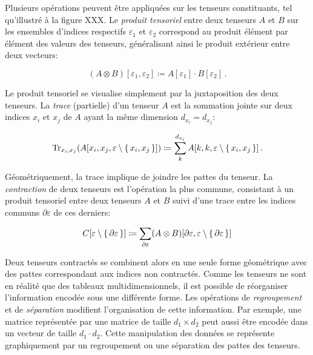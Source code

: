 Plusieurs opérations peuvent être appliquées sur les tenseurs constituants, tel qu'illustré à la figure XXX. Le \textit{produit tensoriel} entre deux tenseurs $A$ et $B$ sur les ensembles d'indices respectifs $\varepsilon_{1}$ et $\varepsilon_{2}$ correspond au produit élément par élément des valeurs des tenseurs, généralisant ainsi le produit extérieur entre deux vecteurs:

\begin{equation}
    (A \otimes B)[\varepsilon_{1}, \varepsilon_{2}] \coloneq A[\varepsilon_{1}] \cdot B[\varepsilon_{2}] \,.
\end{equation}

Le produit tensoriel se visualise simplement par la juxtaposition des deux tenseurs. La \textit{trace} (partielle) d'un tenseur $A$ est la sommation jointe sur deux indices $x_{i}$ et $x_{j}$ de $A$ ayant la même dimension $d_{x_{i}} = d_{x_{j}}$:

\begin{equation}
    \text{Tr}_{x_{i}, x_{j}} (A[x_{i}, x_{j}, \varepsilon \setminus \set{x_{i}, x_{j}}]) \coloneq \sum_{k}^{d_{x_{i}}} A[k, k, \varepsilon \setminus \set{x_{i}, x_{j}} ] \,. 
\end{equation}

Géométriquement, la trace implique de joindre les pattes du tenseur. La \textit{contraction} de deux tenseurs est l'opération la plus commune, consistant à un produit tensoriel entre deux tenseurs $A$ et $B$ suivi d'une trace entre les indices communs $\partial \varepsilon$ de ces derniers:

\begin{equation}
    C[\varepsilon \setminus \set{ \partial \varepsilon}] \coloneq  \sum_{\partial \varepsilon} (A \otimes B)[\partial \varepsilon,  \varepsilon \setminus \set{ \partial \varepsilon}]
\end{equation}

Deux tenseurs contractés se combinent alors en une seule forme géométrique avec des pattes correspondant aux indices non contractés. Comme les tenseurs ne sont en réalité que des tableaux multidimensionnels, il est possible de réorganiser l'information encodée sous une différente forme. Les opérations de \textit{regroupement} et de \textit{séparation} modifient l'organisation de cette information. Par exemple, une matrice représentée par une matrice de taille $d_{1} \times d_{2}$ peut aussi être encodée dans un vecteur de taille $d_{1} \cdot d_{2}$. Cette manipulation des données se représente graphiquement par un regroupement ou une séparation des pattes des tenseurs.


